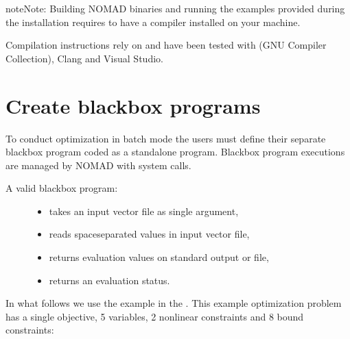 \documentclass[letterpaper,10pt,english]{sphinxmanual}
\let\sphinxpxdimen\pdfpxdimen\else\newdimen\sphinxpxdimen
\begin{document}
\begin{sphinxadmonition}{note}{Note:}
\sphinxAtStartPar
Building NOMAD binaries and running the examples provided during the installation requires to have a  compiler installed on your machine.

\sphinxAtStartPar
Compilation instructions rely on  and have been tested with  (GNU Compiler Collection), Clang and Visual Studio.
\end{sphinxadmonition}


\section{Create blackbox programs}
\label{\detokenize{GettingStarted:create-blackbox-programs}}\label{\detokenize{GettingStarted:create-blackbox-program}}
\sphinxAtStartPar
To conduct optimization in batch mode the users must define their separate blackbox program coded as a standalone program.
Blackbox program executions are managed by NOMAD with system calls.
\begin{description}
\item[{A valid blackbox program:}] \leavevmode\begin{itemize}
\item {} 
\sphinxAtStartPar
takes an input vector file as single argument,

\item {} 
\sphinxAtStartPar
reads space\sphinxhyphen{}separated values in input vector file,

\item {} 
\sphinxAtStartPar
returns evaluation values on standard output or file,

\item {} 
\sphinxAtStartPar
returns an evaluation status.

\end{itemize}

\end{description}

\sphinxAtStartPar
In what follows we use the example in the .
This example optimization problem has a single objective, 5 variables, 2 nonlinear constraints and 8 bound constraints:

\noindent{\sphinxincludegraphics[width=650\sphinxpxdimen]{{example1}.png}\hspace*{\fill}}
\end{document}
